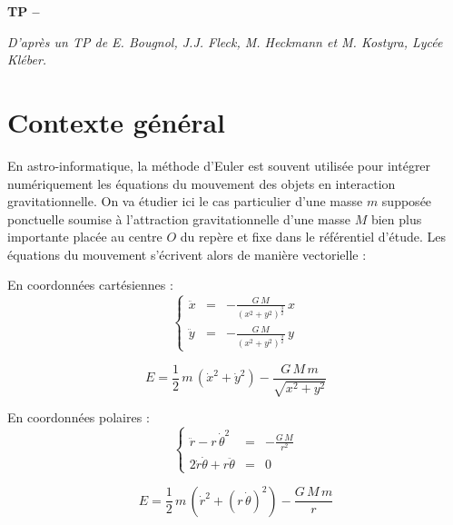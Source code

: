 

%



\begin{center}
{\Large\bf TP \no {\num} -- \descrip}
\end{center}

\begin{small}\textit{D'après un TP de E. Bougnol, J.J. Fleck, M. Heckmann et M. Kostyra, Lycée Kléber.}\end{small}
 
\section*{Contexte général}

En astro-informatique, la méthode d’Euler est souvent utilisée pour intégrer numériquement les équations du mouvement des objets en interaction gravitationnelle. On va étudier ici le cas particulier d’une masse $m$ supposée ponctuelle soumise à l’attraction gravitationnelle d’une masse $M$ bien plus importante placée au centre $O$ du repère et fixe dans le référentiel d'étude. Les équations du mouvement s’écrivent alors de manière vectorielle :


\begin{multicols}{2}
En coordonnées cartésiennes :
\begin{displaymath}
\left\{ \begin{array}{lll}
\ddot{x} & = & \displaystyle - \frac{G\,M}{\left(x^2+y^2\right)^{\frac{3}{2}}}\,x  \\
\ddot{y} & = & \displaystyle - \frac{G\,M}{\left(x^2+y^2\right)^{\frac{3}{2}}}\,y 
\end{array} \right.
\end{displaymath}

$$E = \frac{1}{2}\,m\,(\dot{x}^2+\dot{y}^2)- \frac{G\,M\,m}{\sqrt{x^2+y^2}}$$

    \columnbreak
En coordonnées polaires :
\begin{displaymath}
\left\{ \begin{array}{lll}
\ddot{r}-r\,\dot{\theta}^2 & = & \displaystyle - \frac{G\,M}{r^2} \\
2\dot{r}\dot{\theta}+r\ddot{\theta} & = & 0 
\end{array} \right.
\end{displaymath}

$$E = \frac{1}{2}\,m\,(\dot{r}^2+(r\,\dot{\theta})^2)- \frac{G\,M\,m}{r}$$

\end{multicols}

